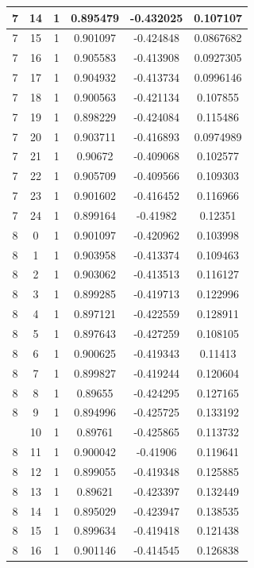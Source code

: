 \documentclass[12pt,a4paper]{article}
\numberwithin{equation}{section}
\numberwithin{figure}{section}
\numberwithin{table}{section}
\begin{document}
\begin{longtable}{|c|c|c|c|c|c|}
7 & 14 & 1 & 0.895479 & -0.432025 & 0.107107 \\ \hline
7 & 15 & 1 & 0.901097 & -0.424848 & 0.0867682 \\ \hline
7 & 16 & 1 & 0.905583 & -0.413908 & 0.0927305 \\ \hline
7 & 17 & 1 & 0.904932 & -0.413734 & 0.0996146 \\ \hline
7 & 18 & 1 & 0.900563 & -0.421134 & 0.107855 \\ \hline
7 & 19 & 1 & 0.898229 & -0.424084 & 0.115486 \\ \hline
7 & 20 & 1 & 0.903711 & -0.416893 & 0.0974989 \\ \hline
7 & 21 & 1 & 0.90672 & -0.409068 & 0.102577 \\ \hline
7 & 22 & 1 & 0.905709 & -0.409566 & 0.109303 \\ \hline
7 & 23 & 1 & 0.901602 & -0.416452 & 0.116966 \\ \hline
7 & 24 & 1 & 0.899164 & -0.41982 & 0.12351 \\ \hline
8 & 0 & 1 & 0.901097 & -0.420962 & 0.103998 \\ \hline
8 & 1 & 1 & 0.903958 & -0.413374 & 0.109463 \\ \hline
8 & 2 & 1 & 0.903062 & -0.413513 & 0.116127 \\ \hline
8 & 3 & 1 & 0.899285 & -0.419713 & 0.122996 \\ \hline
8 & 4 & 1 & 0.897121 & -0.422559 & 0.128911 \\ \hline
8 & 5 & 1 & 0.897643 & -0.427259 & 0.108105 \\ \hline
8 & 6 & 1 & 0.900625 & -0.419343 & 0.11413 \\ \hline
8 & 7 & 1 & 0.899827 & -0.419244 & 0.120604 \\ \hline
8 & 8 & 1 & 0.89655 & -0.424295 & 0.127165 \\ \hline
8 & 9 & 1 & 0.894996 & -0.425725 & 0.133192 \\ \hline
\pagebreak
8 & 10 & 1 & 0.89761 & -0.425865 & 0.113732 \\ \hline
8 & 11 & 1 & 0.900042 & -0.41906 & 0.119641 \\ \hline
8 & 12 & 1 & 0.899055 & -0.419348 & 0.125885 \\ \hline
8 & 13 & 1 & 0.89621 & -0.423397 & 0.132449 \\ \hline
8 & 14 & 1 & 0.895029 & -0.423947 & 0.138535 \\ \hline
8 & 15 & 1 & 0.899634 & -0.419418 & 0.121438 \\ \hline
8 & 16 & 1 & 0.901146 & -0.414545 & 0.126838 \\ \hline

\end{longtable}
\end{document}
